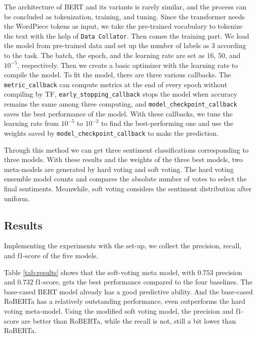 \documentclass[runningheads]{llncs}
\begin{document}
The architecture of BERT and its variants is rarely similar, and the process can be concluded as tokenization, training, and tuning. Since the transformer needs the WordPiece tokens as input, we take the pre-trained vocabulary to tokenize the text with the help of \texttt{Data Collator}. Then comes the training part. We load the model from pre-trained data and set up the number of labels as $3$ according to the task. The batch, the epoch, and the learning rate are set as $16$, $50$, and $10^{-5}$, respectively. Then we create a basic optimizer with the learning rate to compile the model. To fit the model, there are three various callbacks. The \texttt{metric\_callback} can compute metrics at the end of every epoch without compiling by TF,  \texttt{early\_stopping\_callback} stops the model when accuracy remains the same among three computing, and \texttt{model\_checkpoint\_callback} saves the best performance of the model. With these callbacks, we tune the learning rate from $10^{-5}$ to $10^{-2}$ to find the best-performing one and use the weights saved by \texttt{model\_checkpoint\_callback} to make the prediction.

Through this method we can get three sentiment classifications corresponding to three models. With these results and the weights of the three best models, two meta-models are generated by hard voting and soft voting. The hard voting ensemble model counts and compares the absolute number of votes to select the final sentiments. Meanwhile, soft voting considers the sentiment distribution after uniform.

\subsection{Results}
Implementing the experiments with the set-up, we collect the precision, recall, and f1-score of the five models.

Table \ref{tab:results} shows that the soft-voting meta model, with $0.753$ precision and $0.732$ f1-score, gets the best performance compared to the four baselines. The base-cased BERT model already has a good predictive ability. And the base-cased RoBERTa has a relatively outstanding performance, even outperforms the hard voting meta-model. Using the modified soft voting model, the precision and f1-score are better than RoBERTa, while the recall is not, still a bit lower than RoBERTa.
\end{document}
